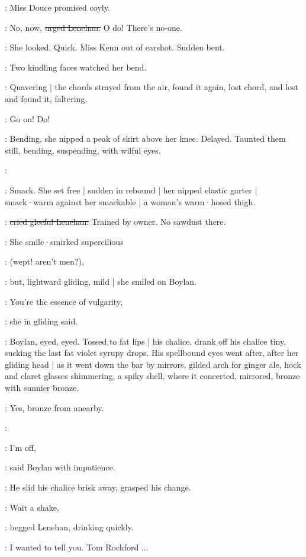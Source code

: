 :
Miss Douce promised coyly.

\lenehan:
No,
now,
\sout{urged Lenehan.}
O do!
There's no-one.

:
She looked.
Quick.
Miss Kenn out of earshot.
Sudden bent.

:
Two kindling faces watched her bend.

:
Quavering |
the chords strayed from the air,
found it again,
lost chord,
and lost and found it,
faltering.

\lenehan:
Go on!
Do!

:
Bending,
she nipped a peak of skirt above her knee.
Delayed.
Taunted them still,
bending,
suspending,
with wilful eyes.

\lenehan:

:
Smack.
She set free |
sudden in rebound |
her nipped elastic garter |
smack·warm against her smackable |
a woman's warm·hosed thigh.

\lenehan:
\sout{cried gleeful Lenehan.}
Trained by owner.
No sawdust there.

:
She smile·smirked supercilious

\MissDInt:
(wept!
aren't men?),

:
but,
lightward gliding,
mild |
she smiled on Boylan.

\MissD:
You're the essence of vulgarity,

:
she in gliding said.

:
Boylan,
eyed,
eyed.
Tossed to fat lips |
his chalice,
drank off his chalice tiny,
sucking the last fat violet syrupy drops.
His spellbound eyes went after,
after her gliding head |
as it went down the bar by mirrors,
gilded arch for ginger ale,
hock and claret glasses shimmering,
a spiky shell,
where it concerted,
mirrored,
bronze with sunnier bronze.

:
Yes,
bronze from anearby.

\simon:

\boylan:
I'm off,

:
said Boylan with impatience.

:
He slid his chalice brisk away,
grasped his change.

\lenehan:
Wait a shake,

:
begged Lenehan,
drinking quickly.

\lenehan:
I wanted to tell you.
Tom Rochford ...

